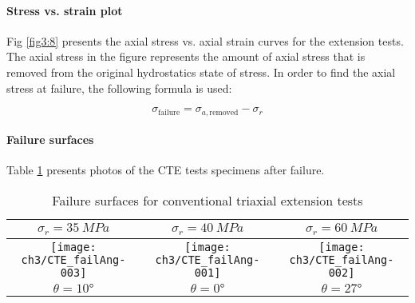 \paragraph{Stress vs. strain plot}

Fig \ref{fig3:8} presents the axial stress vs. axial strain curves for the extension tests. The axial stress in the figure represents the amount of axial stress that is removed from the original hydrostatics state of stress. In order to find the axial stress at failure, the following formula is used: 

\begin{equation}
    \sigma_\text{failure} = \sigma_{a,\text{removed}} - \sigma_r
\end{equation}

\paragraph{Failure surfaces}

Table \ref{tb3:photoCTE} presents photos of the CTE tests specimens after failure. 


\begin{table}
    \centering
    \captionsetup{justification=centering}
    \caption{Failure surfaces for conventional triaxial extension tests}
    \begin{tabular}{|c|c|c|}
     \hline
     $\sigma_r = \SI{35}{MPa}$ & $\sigma_r = \SI{40}{MPa}$ &  $\sigma_r = \SI{60}{MPa}$ \\
     \hline
     \texttt{[image: ch3/CTE\_failAng-003]} & 
     \texttt{[image: ch3/CTE\_failAng-001]} &
     \texttt{[image: ch3/CTE\_failAng-002]} \\
     \hline
     $\theta = \ang{10}$ & $\theta = \ang{0}$  &  $\theta = \ang{27}$ \\
     \hline
    \end{tabular}
    \label{tb3:photoCTE}
\end{table}

